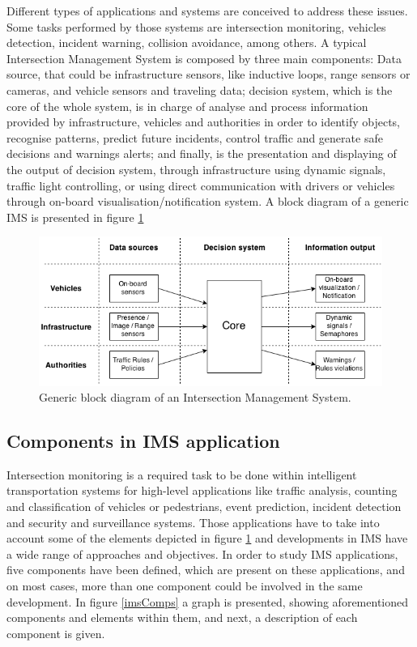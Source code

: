 \documentclass[conference]{IEEEtran}
\begin{document}
Different types of applications and systems are conceived to address these issues. Some tasks performed by those systems are intersection monitoring, vehicles detection, incident warning, collision avoidance, among others. A typical Intersection Management System is composed by three main components: Data source, that could be infrastructure sensors, like inductive loops, range sensors or cameras, and vehicle sensors and traveling data; decision system, which is the core of the whole system, is in charge of analyse and process information provided by infrastructure, vehicles and authorities in order to identify objects, recognise patterns, predict future incidents, control traffic and generate safe decisions and warnings alerts; and finally, is the presentation and displaying of the output of decision system, through infrastructure using dynamic signals, traffic light controlling, or using direct communication with drivers or vehicles through on-board visualisation/notification system. A block diagram of a generic IMS is presented in figure \ref{arch}

\begin{figure}[ht!]
\centering
\includegraphics[scale=0.38]{../fig/2/genericIMS.png}
\caption{Generic block diagram of an Intersection Management System.}
\label{arch}
\end{figure}

\subsection{Components in IMS application}

Intersection monitoring is a required task to be done within intelligent transportation systems for high-level applications like traffic analysis, counting and classification of vehicles or pedestrians, event prediction, incident detection and security and surveillance systems. Those applications have to take into account some of the elements depicted in figure \ref{arch} and developments in IMS have a wide range of approaches and objectives. In order to study IMS applications, five components have been defined, which are present on these applications, and on most cases, more than one component could be involved in the same development. In figure  \ref{imsComps} a graph is presented, showing aforementioned components and elements within them, and next, a description of each component is given.
\end{document}
